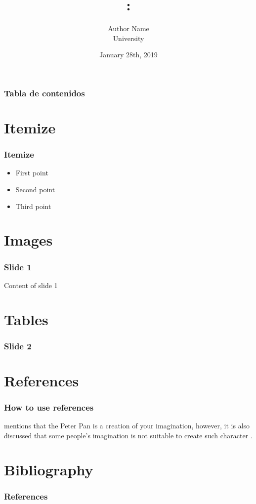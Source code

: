 \documentclass[english,svgnames,notes=hide,12pt]{beamer}
\title{\large\seminarname:\\\large\presentationtitle}
\author{Author Name\\
    \small University
}
\date{January 28th, 2019}
\begin{document}
\newcommand{\addsource}[1]{\centering\tiny{Source: \url{#1}}}

\thispagestyle{empty}
\begin{frame}
    \titlepage
\end{frame}

\begin{frame}
    \frametitle{\textbf{Tabla de contenidos}}
    \begin{minipage}[t][4cm][t]{\textwidth}
    \tableofcontents
    \end{minipage}
\end{frame}


\section{Itemize}
\begin{frame}
\frametitle{Itemize}
\begin{itemize}[<+->]
    \item First point
    \item Second point
    \item Third point
\end{itemize}
\end{frame}

\section{Images}
\begin{frame}
	\frametitle{Slide 1}
	Content of slide 1
\end{frame}

\section{Tables}
\begin{frame}
	\frametitle{Slide 2}
\end{frame}

\section{References}
\begin{frame}
    \frametitle{How to use references}
     mentions that the Peter Pan is a creation of your imagination, however, it is also discussed that some people's imagination is not suitable to create such character .
\end{frame}

\section*{Bibliography}
\begin{frame}[allowframebreaks]
    \frametitle{References}
    \fontsize{5pt}{6.2}\selectfont
    
    \renewcommand{\bibliographytypesize}{\small}
    
\end{frame}
\end{document}
